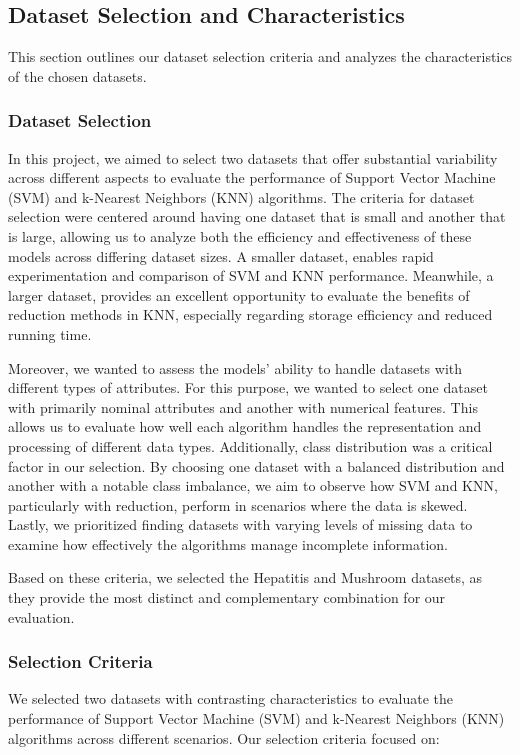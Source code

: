 \subsection{Dataset Selection and Characteristics}
\label{subsec:dataset}

This section outlines our dataset selection criteria and analyzes the characteristics of the chosen datasets.

\subsubsection{Dataset Selection}
In this project, we aimed to select two datasets that offer substantial variability across different aspects to evaluate the performance of Support Vector Machine (SVM) and k-Nearest Neighbors (KNN) algorithms.
The criteria for dataset selection were centered around having one dataset that is small and another that is large, allowing us to analyze both the efficiency and effectiveness of these models across differing dataset sizes.
A smaller dataset, enables rapid experimentation and comparison of SVM and KNN performance.
Meanwhile, a larger dataset, provides an excellent opportunity to evaluate the benefits of reduction methods in KNN, especially regarding storage efficiency and reduced running time.

Moreover, we wanted to assess the models' ability to handle datasets with different types of attributes.
For this purpose, we wanted to select one dataset with primarily nominal attributes and another with numerical features.
This allows us to evaluate how well each algorithm handles the representation and processing of different data types.
Additionally, class distribution was a critical factor in our selection. By choosing one dataset with a balanced distribution and another with a notable class imbalance, we aim to observe how SVM and KNN, particularly with reduction, perform in scenarios where the data is skewed.
Lastly, we prioritized finding datasets with varying levels of missing data to examine how effectively the algorithms manage incomplete information.

Based on these criteria, we selected the Hepatitis and Mushroom datasets, as they provide the most distinct and complementary combination for our evaluation.
\subsubsection{Selection Criteria}
We selected two datasets with contrasting characteristics to evaluate the performance of Support Vector Machine (SVM) and k-Nearest Neighbors (KNN) algorithms across different scenarios. Our selection criteria focused on:

